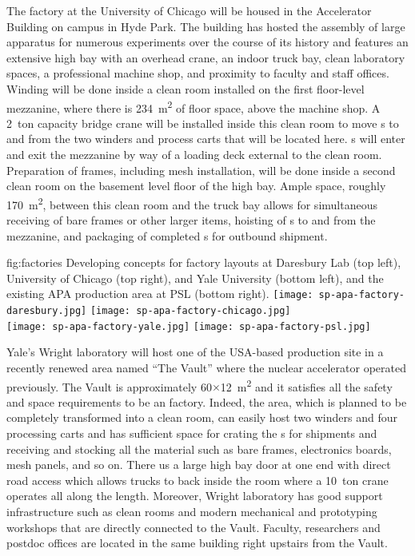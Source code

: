 The  factory at the University of Chicago will be housed in the Accelerator Building on campus in Hyde Park.  The building has hosted the assembly of large apparatus for numerous experiments over the course of its history and features an extensive high bay with an overhead crane, an indoor truck bay, clean laboratory spaces, a professional machine shop, and proximity to faculty and staff offices.  Winding will be done inside a clean room installed on the first floor-level mezzanine, where there is \SI{234}{m^2} of floor space, above the machine shop.  A \SI{2}{ton} capacity bridge crane will be installed inside this clean room to move s to and from the two winders and process carts that will be located here.  s will enter and exit the mezzanine by way of a loading deck external to the clean room.  Preparation of  frames, including mesh installation, will be done inside a second clean room on the basement level floor of the high bay.  Ample space, roughly \SI{170}{m^2}, between this clean room and the truck bay allows for simultaneous receiving of bare frames or other larger items, hoisting of s to and from the mezzanine, and packaging of completed s for outbound shipment.

\begin{dunefigure}{fig:factories}
{Developing concepts for factory layouts at Daresbury Lab (top left), University of Chicago (top right), and Yale University (bottom left), and the existing APA production area at PSL (bottom right).}
\texttt{[image: sp-apa-factory-daresbury.jpg]} 
\texttt{[image: sp-apa-factory-chicago.jpg]} \\
\vspace{1mm}
\texttt{[image: sp-apa-factory-yale.jpg]}
\texttt{[image: sp-apa-factory-psl.jpg]} 
\end{dunefigure}

Yale's Wright laboratory will host one of the USA-based  production site in a recently renewed area named ``The Vault'' %
where the nuclear accelerator operated previously.  The Vault is approximately 60$\times$\SI{12}{m^2} and it satisfies all the safety and space requirements to be an  factory. 
Indeed, the area, which is planned to be completely transformed into a clean room, can easily host two winders and four processing carts and has sufficient space for crating the s for shipments and receiving and stocking all the material such as bare frames, electronics boards, mesh panels, and so on. 
There us a large high bay door at one end with direct road access which allows trucks to back inside the room where a \SI{10}{ton} crane operates all along the length.  Moreover, Wright laboratory has good support infrastructure such as clean rooms and modern mechanical and prototyping workshops that are directly connected to the Vault. Faculty, researchers and postdoc offices are located in the same building right upstairs from the Vault.

